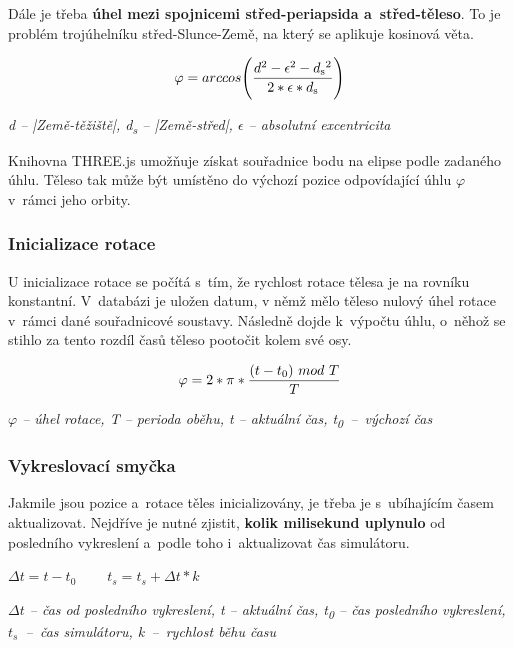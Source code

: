 \documentclass[a4paper,12pt]{article}
\begin{document}
Dále je třeba \textbf{úhel mezi spojnicemi střed-periapsida a~střed-těleso}. To je problém trojúhelníku střed-Slunce-Země, na který se aplikuje kosinová věta.

\vspace*{-0.5cm}
$$\varphi = arccos\Bigg(\frac{d^2 - \epsilon^2 - d\textsubscript{s}^2}{2 * \epsilon * d\textsubscript{s}}\Bigg)$$
\begin{center}
\textit{d -- |Země-těžiště|, d\textsubscript{s} -- |Země-střed|, $\epsilon$ -- absolutní excentricita}~\cite{michalrepik}
\end{center}

Knihovna THREE.js umožňuje získat souřadnice bodu na elipse podle zadaného úhlu. Těleso tak může být umístěno do výchozí pozice odpovídající úhlu $\varphi$ v~rámci jeho orbity.

\subsubsection{Inicializace rotace}

U inicializace rotace se počítá s~tím, že rychlost rotace tělesa je na rovníku konstantní. V~databázi je uložen datum, v němž mělo těleso nulový úhel rotace v~rámci dané souřadnicové soustavy. Následně dojde k~výpočtu úhlu, o~něhož se stihlo za tento rozdíl časů těleso pootočit kolem své osy.

\vspace*{-0.5cm}
$$\varphi = 2 * \pi * \frac{(t - t\textsubscript{0})~mod~T}{T}$$

\begin{center}
\textit{$\varphi$ -- úhel rotace, T -- perioda oběhu, t -- aktuální čas, t\textsubscript{0}~--~výchozí čas}
\end{center}

\subsubsection{Vykreslovací smyčka}

Jakmile jsou pozice a~rotace těles inicializovány, je třeba je s~ubíhajícím časem aktualizovat. Nejdříve je nutné zjistit, \textbf{kolik milisekund uplynulo} od posledního vykreslení a~podle toho i~aktualizovat čas simulátoru.

\begin{center}
$\Delta t = t - t_{0}~~~~~~~~~~t_{s} = t_{s} + \Delta t * k$

\textit{$\Delta t$ -- čas od posledního vykreslení, t -- aktuální čas, t\textsubscript{0} -- čas posledního vykreslení, $t_{s}$~--~čas simulátoru, k~--~rychlost běhu času}
\end{center}
\end{document}

